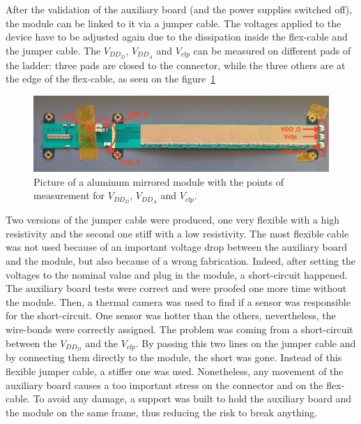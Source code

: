 
  After the validation of the auxiliary board (and the power supplies switched off), the module can be linked to it via a jumper cable.
  The voltages applied to the device have to be adjusted again due to the dissipation inside the flex-cable and the jumper cable.
  The $V_{DD_D}$, $V_{DD_A}$ and $V_{clp}$ can be measured on different pads of the ladder: three pads are closed to the connector, while the three others are at the edge of the flex-cable, as seen on the figure~\ref{fig:voltagePads}

  \begin{figure}[!h]
    \centering
    \includegraphics[width=\textwidth]{Pictures/labTests/AM01_voltagePads.jpg}
    \caption{Picture of a aluminum mirrored module with the points of measurement for $V_{DD_D}$, $V_{DD_A}$ and $V_{clp}$.}
    \label{fig:voltagePads}
  \end{figure}

  Two versions of the jumper cable were produced, one very flexible with a high resistivity and the second one stiff with a low resistivity.
  The most flexible cable was not used because of an important voltage drop between the auxiliary board and the module, but also because of a wrong fabrication.
  Indeed, after setting the voltages to the nominal value and plug in the module, a short-circuit happened.
  The auxiliary board tests were correct and were proofed one more time without the module.
  Then, a thermal camera was used to find if a sensor was responsible for the short-circuit.
  One sensor was hotter than the others, nevertheless, the wire-bonds were correctly assigned.
  The problem was coming from a short-circuit between the $V_{DD_D}$ and the $V_{clp}$.
  By passing this two lines on the jumper cable and by connecting them directly to the module, the short was gone.
  Instead of this flexible jumper cable, a stiffer one was used.
  Nonetheless, any movement of the auxiliary board causes a too important stress on the connector and on the flex-cable.
  To avoid any damage, a support was built to hold the auxiliary board and the module on the same frame, thus reducing the risk to break anything.

